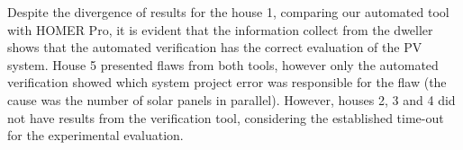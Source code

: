 \documentclass[journal]{IEEEtran}
\begin{document}
Despite the divergence of results for the house 1, comparing our automated tool with HOMER Pro, it is evident that the information collect from the dweller shows that the automated verification has the correct evaluation of the PV system. House 5 presented flaws from both tools, however only the automated verification showed which system project error was responsible for the flaw (the cause was the number of solar panels in parallel). However, houses 2, 3 and 4 did not have results from the verification tool, considering the established time-out for the experimental evaluation.
%
%
\end{document}
